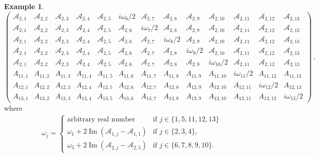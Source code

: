 \documentclass[aps,pre,reprint,longbibliography,superscriptaddress,noshowpacs,floatfix]{revtex4-2}
\theoremstyle{definition}
\newtheorem{example}[theorem]{Example}
\theoremstyle{remark}
\DeclareMathOperator{\Imag}{Im}
\begin{document}
\begin{example}
\begin{equation*}
\begin{pmatrix}
        \mathcal{A}_{2,1} & \mathcal{A}_{2,2} & \mathcal{A}_{2,3} & \mathcal{A}_{2,4} & \mathcal{A}_{2,5} & i\omega_6/2 & \mathcal{A}_{2,7} & \mathcal{A}_{2,8}& \mathcal{A}_{2,9} & \mathcal{A}_{2,10} & \mathcal{A}_{2,11} & \mathcal{A}_{2,12} & \mathcal{A}_{2,13}\\
        \mathcal{A}_{2,1} & \mathcal{A}_{2,2} & \mathcal{A}_{2,3} & \mathcal{A}_{2,4} & \mathcal{A}_{2,5} & \mathcal{A}_{2,6}& i\omega_7/2 & \mathcal{A}_{2,8}& \mathcal{A}_{2,9} & \mathcal{A}_{2,10} & \mathcal{A}_{2,11} & \mathcal{A}_{2,12} & \mathcal{A}_{2,13}\\
        \mathcal{A}_{2,1} & \mathcal{A}_{2,2} & \mathcal{A}_{2,3} & \mathcal{A}_{2,4} & \mathcal{A}_{2,5} & \mathcal{A}_{2,6}& \mathcal{A}_{2,7} & i\omega_8/2& \mathcal{A}_{2,9} & \mathcal{A}_{2,10} & \mathcal{A}_{2,11} & \mathcal{A}_{2,12} & \mathcal{A}_{2,13}\\
        \mathcal{A}_{2,1} & \mathcal{A}_{2,2} & \mathcal{A}_{2,3} & \mathcal{A}_{2,4} & \mathcal{A}_{2,5} & \mathcal{A}_{2,6}& \mathcal{A}_{2,7} & \mathcal{A}_{2,8}& i\omega_9/2 & \mathcal{A}_{2,10} & \mathcal{A}_{2,11} & \mathcal{A}_{2,12} & \mathcal{A}_{2,13}\\
        \mathcal{A}_{2,1} & \mathcal{A}_{2,2} & \mathcal{A}_{2,3} & \mathcal{A}_{2,4} & \mathcal{A}_{2,5} & \mathcal{A}_{2,6}& \mathcal{A}_{2,7} & \mathcal{A}_{2,8}& \mathcal{A}_{2,9} & i\omega_{10}/2 & \mathcal{A}_{2,11} & \mathcal{A}_{2,12} & \mathcal{A}_{2,13}\\
        \hline
        A_{11,1} & A_{11,2} & A_{11,3} & A_{11,4} & A_{11,5}& A_{11,6}& A_{11,7}& A_{11,8}& A_{11,9}& A_{11,10}& i\omega_{11}/2& A_{11,12}& A_{11,13}\\
        A_{12,1} & A_{12,2} & A_{12,3} & A_{12,4} & A_{12,5}& A_{12,6}& A_{12,7}& A_{12,8}& A_{12,9}& A_{12,10}& A_{12,11}& i\omega_{12}/2& A_{12,13}\\
        A_{13,1} & A_{13,2} & A_{13,3} & A_{13,4} & A_{13,5}& A_{13,6}& A_{13,7}& A_{13,8}& A_{13,9}& A_{13,10}& A_{13,11}& A_{13,12}& i\omega_{13}/2
    \end{pmatrix}\,,
\end{equation*}
    where
    \begin{align*}
    \omega_j = \begin{cases} 
    \text{arbitrary real number} & \text{if } j\in\{1, 5, 11, 12, 13\}\\
    \omega_1 + 2\Imag(\mathcal{A}_{1,j} - \mathcal{A}_{1,1})& \text{if } j\in \{2,3,4\}, \\
    \omega_5 + 2\Imag(\mathcal{A}_{2,j} - \mathcal{A}_{2,5}) & \text{if } j\in \{6,7,8,9,10\}.

\end{cases}
\end{align*}
\end{example}
\end{document}
